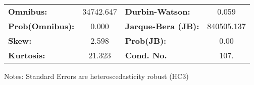 \begin{center}
\begin{tabular}{lcccccc}
\bottomrule
\end{tabular}
\begin{tabular}{lclc}
\textbf{Omnibus:}       & 34742.647 & \textbf{  Durbin-Watson:     } &     0.059   \\
\textbf{Prob(Omnibus):} &    0.000  & \textbf{  Jarque-Bera (JB):  } & 840505.137  \\
\textbf{Skew:}          &    2.598  & \textbf{  Prob(JB):          } &      0.00   \\
\textbf{Kurtosis:}      &   21.323  & \textbf{  Cond. No.          } &      107.   \\
\bottomrule
\end{tabular}
\end{center}

Notes: \newline
 [1] Standard Errors are heteroscedasticity robust (HC3)